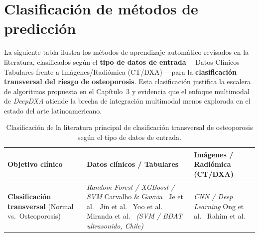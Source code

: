\documentclass[../tesis.tex]{subfiles}
\begin{document}
\chapter{Clasificación de métodos de predicción}
\label{apendice:clasificacion_ml}

La siguiente tabla ilustra los métodos de aprendizaje automático revisados en la literatura,
clasificados según el \textbf{tipo de datos de entrada} ---Datos Clínicos Tabulares frente a
Imágenes/Radiómica (CT/DXA)--- para la \textbf{clasificación transversal del riesgo de osteoporosis}.
Esta clasificación justifica la escalera de algoritmos propuesta en el Capítulo~3 y evidencia
que el enfoque multimodal de \textit{DeepDXA} atiende la brecha de integración multimodal
menos explorada en el estado del arte latinoamericano.

\vspace{0.5em}

\begin{table}[h]
\centering
\caption{Clasificación de la literatura principal de clasificación transversal de osteoporosis según el tipo de datos de entrada.}
\label{tab:clasificacion_ml}
\renewcommand{\arraystretch}{1.6}
\begin{tabular}{p{4.2cm} p{5.2cm} p{5.2cm}}
\toprule
\rowcolor{tableheader}
\textbf{Objetivo clínico} &
\textbf{Datos clínicos / Tabulares} &
\textbf{Imágenes / Radiómica (CT/DXA)} \\
\midrule
\textbf{Clasificación transversal} \newline
(Normal vs.\ Osteoporosis) &
\textit{Random Forest / XGBoost / SVM} \newline
Carvalho \& Gavaia~\cite{Carvalho2025} \newline
Je et al.~\cite{Je2025} \newline
Jin et al.~\cite{Jin2025} \newline
Yoo et al.~\cite{Yoo2013} \newline
Miranda et al.~\cite{Miranda2021} \newline
\textit{(SVM / BDAT ultrasonido, Chile)} &
\textit{CNN / Deep Learning} \newline
Ong et al.~\cite{Ong2023} \newline
Rahim et al.~\cite{Rahim2023} \\
\bottomrule
\end{tabular}
\end{table}

\clearpage
\end{document}
